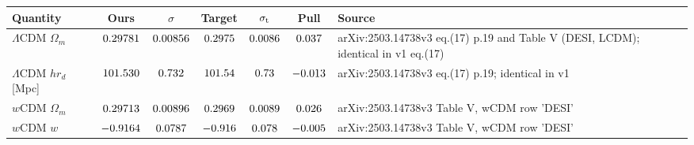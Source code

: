 \begin{tabular}{lcccccp{4.2cm}}
\toprule
Quantity & Ours & $\sigma$ & Target & $\sigma_{\rm t}$ & Pull & Source \\
\midrule
$\Lambda$CDM $\Omega_m$ & $0.29781$ & $0.00856$ & $0.2975$ & $0.0086$ & $0.037$ & \scriptsize arXiv:2503.14738v3 eq.(17) p.19 and Table V (DESI, LCDM); identical in v1 eq.(17) \\
$\Lambda$CDM $h r_d$ [Mpc] & $101.530$ & $0.732$ & $101.54$ & $0.73$ & $-0.013$ & \scriptsize arXiv:2503.14738v3 eq.(17) p.19; identical in v1 \\
$w$CDM $\Omega_m$ & $0.29713$ & $0.00896$ & $0.2969$ & $0.0089$ & $0.026$ & \scriptsize arXiv:2503.14738v3 Table V, wCDM row 'DESI' \\
$w$CDM $w$ & $-0.9164$ & $0.0787$ & $-0.916$ & $0.078$ & $-0.005$ & \scriptsize arXiv:2503.14738v3 Table V, wCDM row 'DESI' \\
\bottomrule
\end{tabular}
